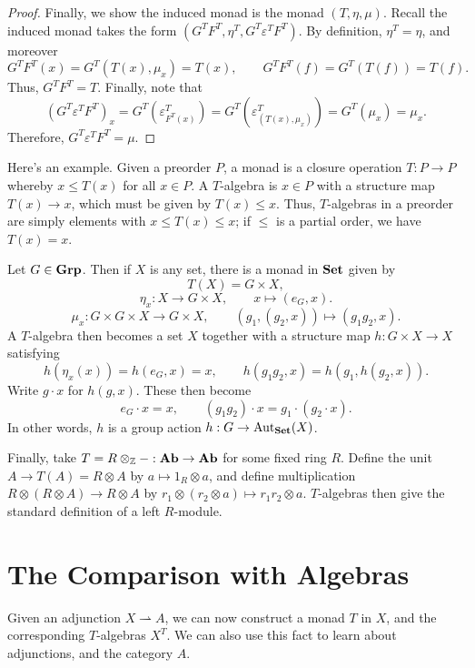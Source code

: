 \begin{proof}
	Finally, we show the induced monad is the monad $(T,\eta,\mu)$. Recall the induced monad takes the form $(G^TF^T,\eta^T,G^T\varepsilon ^TF^T)$. By definition, $\eta^T=\eta$, and moreover
	\[
		G^TF^T(x)=G^T(T(x),\mu_x)=T(x),\qquad G^TF^T(f)=G^T(T(f))=T(f)
	.\]
	Thus, $G^TF^T=T$. Finally, note that
	\[
		\left( G^T\varepsilon ^TF^T \right)_x = G^T(\varepsilon^T_{F^T(x)} )=G^T(\varepsilon^T_{(T(x),\mu_x)} )=G^T(\mu_x)=\mu_x
	.\]
	Therefore, $G^T\varepsilon ^TF^T=\mu$.
\end{proof}

Here's an example. Given a preorder $P$, a monad is a closure operation $T : P \to P$ whereby $x\leq T(x)$ for all $x\in P$. A $T$-algebra is $x\in P$ with a structure map $T(x)\to x$, which must be given by $T(x)\leq x$. Thus, $T$-algebras in a preorder are simply elements with $x\leq T(x)\leq x$; if $\leq $ is a partial order, we have $T(x)=x$.

Let $G\in \mathbf{Grp} $. Then if $X$ is any set, there is a monad in $\mathbf{Set} $ given by
\[
	T(X) = G\times X,
\]
\[
	\eta_x : X \to G\times X,\qquad x\mapsto (e_G,x).
\]
\[
	\mu_x : G\times G\times X \to G\times X,\qquad (g_1,(g_2,x))\mapsto (g_1g_2,x)
.\]
A $T$-algebra then becomes a set $X$ together with a structure map $h:G\times X\to X$ satisfying
\[
	h(\eta_x(x))=h(e_G,x)=x,\qquad h(g_1g_2,x)=h(g_1,h(g_2,x))
.\]
Write $g\cdot x$ for $h(g,x)$. These then become
\[
	e_G\cdot x=x,\qquad (g_1g_2)\cdot x=g_1\cdot (g_2\cdot x)
.\]
In other words, $h$ is a group action $h : G \to \operatorname{Aut}_{\mathbf{Set} }(X) $.

Finally, take $T=R\otimes _\mathbb{Z} -: \mathbf{Ab} \to \mathbf{Ab}$ for some fixed ring $R$. Define the unit $A\to T(A)=R\otimes A$ by $a\mapsto 1_R \otimes a$, and define multiplication $R\otimes (R\otimes A)\to R\otimes A$ by $r_1 \otimes (r_2 \otimes a)\mapsto r_1r_2\otimes a$. $T$-algebras then give the standard definition of a left $R$-module.

\section{The Comparison with Algebras}

Given an adjunction $X\rightharpoonup A$, we can now construct a monad $T$ in $X$, and the corresponding $T$-algebras $X^T$. We can also use this fact to learn about adjunctions, and the category $A$.

